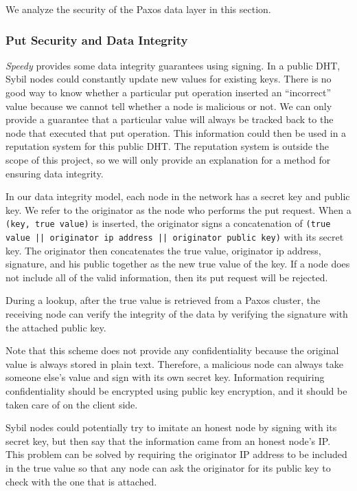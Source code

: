 \documentclass[letter]{article}
\newcommand{\sys}{\textit{Speedy}}
\begin{document}
We analyze the security of the Paxos data layer in this section.

\subsubsection{Put Security and Data Integrity}
\sys{} provides some data integrity guarantees using signing. In a public DHT, Sybil nodes could constantly update
new values for existing keys. There is no good way to know whether a particular
put operation inserted an ``incorrect'' value because we cannot tell whether
a node is malicious or not. We can only provide a guarantee that a particular
value will always be tracked back to the node that executed that put operation.
This information could then be used in a reputation system for this public DHT.
The reputation system is outside the scope of this project, so we will only
provide an explanation for a method for ensuring data integrity.

In our data integrity model,
each node in the network has a secret key and public key. We refer to the originator as the node who performs the put request. When a \texttt{(key, true value)} is inserted, the originator signs a concatenation of \texttt{(true value || originator ip address || originator public key)} with its secret key.
The originator then concatenates the true value, originator ip address, signature, and his public together as the new true value of the key.
If a node does not include all of the valid information, then its put request will be rejected.

During a lookup, after the true value is retrieved from a Paxos cluster, the receiving node can verify the integrity of the data by verifying the signature with the attached public key.

Note that this scheme does not provide any confidentiality because the original value
is always stored in plain text. Therefore, a malicious node can always take someone else's value and sign with its own secret key. Information requiring confidentiality should be
encrypted using public key encryption, and it should be taken care of on the client side.

Sybil nodes could potentially try to imitate an honest node by signing with its secret key,
but then say that the information came from an honest node's IP. This problem can be solved by
requiring the originator IP address to be included in the true value so that any node can ask the originator for its public key to check with the one that is attached.
\end{document}

